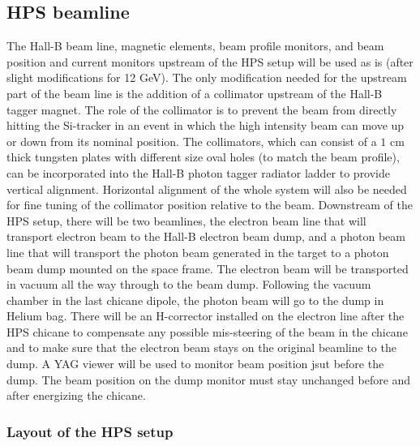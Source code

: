  \subsection{HPS beamline}
 \label{setup:beamline}
 
The Hall-B beam line, magnetic elements, beam profile monitors, and beam position and current monitors upstream of the HPS setup will be 
used as is (after slight modifications for 12 GeV). The only modification needed for the upstream part of the beam line is the addition of 
a collimator upstream of the Hall-B tagger magnet. The role of the collimator is to prevent the beam from directly hitting the Si-tracker in an 
event in which the high intensity beam can move up or down from its nominal position. The collimators, which  can consist of  a $1$ cm 
thick tungsten plates with different size oval holes (to match the beam profile), can be incorporated into the Hall-B photon tagger radiator ladder 
to provide vertical alignment. Horizontal alignment of the whole system will also be needed for fine tuning of the collimator position 
relative to the beam. Downstream of the HPS setup, there will be two beamlines, the electron beam line that will transport electron beam to the 
Hall-B electron beam dump, and a photon beam line that will transport the photon beam generated in the target to a photon beam dump mounted 
on the space frame. The electron beam will be transported in vacuum all the way through to the beam dump. Following the vacuum 
chamber in the last chicane dipole, the photon beam will go to the dump in Helium bag. There will be an H-corrector installed on the electron 
line after 
the HPS chicane to compensate any possible mis-steering of the beam in the chicane and to make sure that the electron beam stays on the 
original beamline to the dump. A YAG viewer will be used to monitor beam position jsut before the dump. The beam position on the dump monitor 
must stay unchanged before and after energizing the chicane.  
 
 \subsubsection{Layout of the HPS setup} 
 \label{setup:layout}
 
